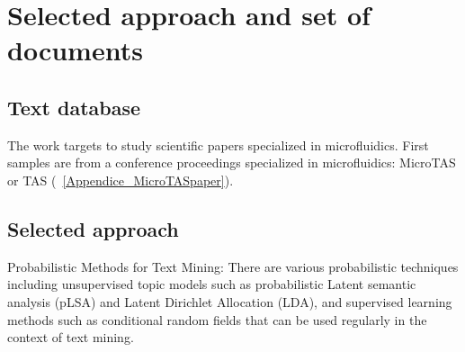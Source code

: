 \section{Selected approach and set of documents}

\subsection{Text database}
The work targets to study scientific papers specialized in microfluidics. First samples are from a conference proceedings specialized in microfluidics: MicroTAS or \textmu TAS (\appendice~\ref{Appendice_MicroTASpaper}).

\subsection{Selected approach}
Probabilistic Methods for Text Mining: 
There are various probabilistic techniques including unsupervised topic models such as probabilistic Latent semantic analysis (pLSA) and Latent Dirichlet Allocation (LDA), and supervised learning methods such as conditional random fields that can be used regularly in the context of text mining.
